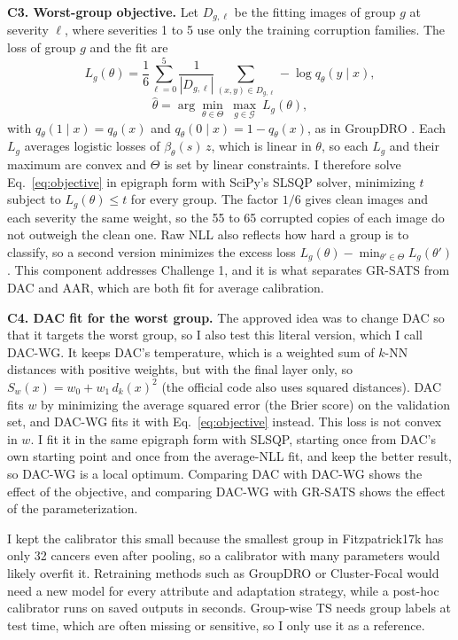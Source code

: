 \documentclass[sigconf,nonacm]{acmart}
\begin{document}
\textbf{C3. Worst-group objective.} Let $D_{g,\ell}$ be the fitting images of group $g$ at severity $\ell$, where severities 1 to 5 use only the training corruption families. The loss of group $g$ and the fit are
\begin{equation}
  L_g(\theta) = \frac{1}{6}\sum_{\ell=0}^{5}\frac{1}{|D_{g,\ell}|}\sum_{(x,y)\in D_{g,\ell}} -\log q_\theta(y \mid x),
  \label{eq:grouploss}
\end{equation}
\begin{equation}
  \hat{\theta} = \arg\min_{\theta \in \Theta}\ \max_{g \in \mathcal{G}}\ L_g(\theta),
  \label{eq:objective}
\end{equation}
with $q_\theta(1 \mid x) = q_\theta(x)$ and $q_\theta(0 \mid x) = 1 - q_\theta(x)$, as in GroupDRO \cite{sagawa2020groupdro}. Each $L_g$ averages logistic losses of $\beta_\theta(s)\, z$, which is linear in $\theta$, so each $L_g$ and their maximum are convex and $\Theta$ is set by linear constraints. I therefore solve Eq.~\eqref{eq:objective} in epigraph form with SciPy's SLSQP solver, minimizing $t$ subject to $L_g(\theta) \leq t$ for every group. The factor $1/6$ gives clean images and each severity the same weight, so the 55 to 65 corrupted copies of each image do not outweigh the clean one. Raw NLL also reflects how hard a group is to classify, so a second version minimizes the excess loss $L_g(\theta) - \min_{\theta' \in \Theta} L_g(\theta')$. This component addresses Challenge 1, and it is what separates GR-SATS from DAC and AAR, which are both fit for average calibration.

\textbf{C4. DAC fit for the worst group.} The approved idea was to change DAC so that it targets the worst group, so I also test this literal version, which I call DAC-WG. It keeps DAC's temperature, which is a weighted sum of $k$-NN distances with positive weights, but with the final layer only, so $S_w(x) = w_0 + w_1\, d_k(x)^2$ (the official code also uses squared distances). DAC fits $w$ by minimizing the average squared error (the Brier score) on the validation set, and DAC-WG fits it with Eq.~\eqref{eq:objective} instead. This loss is not convex in $w$. I fit it in the same epigraph form with SLSQP, starting once from DAC's own starting point and once from the average-NLL fit, and keep the better result, so DAC-WG is a local optimum. Comparing DAC with DAC-WG shows the effect of the objective, and comparing DAC-WG with GR-SATS shows the effect of the parameterization.

I kept the calibrator this small because the smallest group in Fitzpatrick17k has only 32 cancers even after pooling, so a calibrator with many parameters would likely overfit it. Retraining methods such as GroupDRO or Cluster-Focal would need a new model for every attribute and adaptation strategy, while a post-hoc calibrator runs on saved outputs in seconds. Group-wise TS needs group labels at test time, which are often missing or sensitive, so I only use it as a reference.
\end{document}

